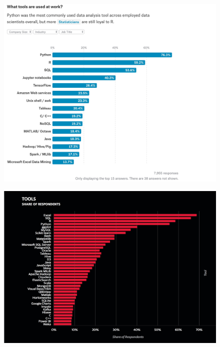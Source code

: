 \documentclass[12pt]{book}\usepackage{knitr}
\begin{document}
    \begin{figure}[ht] %
      \centering
      \includegraphics[width = 15 cm]{./viz/ext/Kaggle_DS_Tools_Survey.jpeg}
    \end{figure}

    \begin{figure}[ht] %
      \centering
      \includegraphics[width = 15 cm]{./viz/ext/OR_DS_Tools_Survey.jpeg}
    \end{figure}
    
\end{document}
